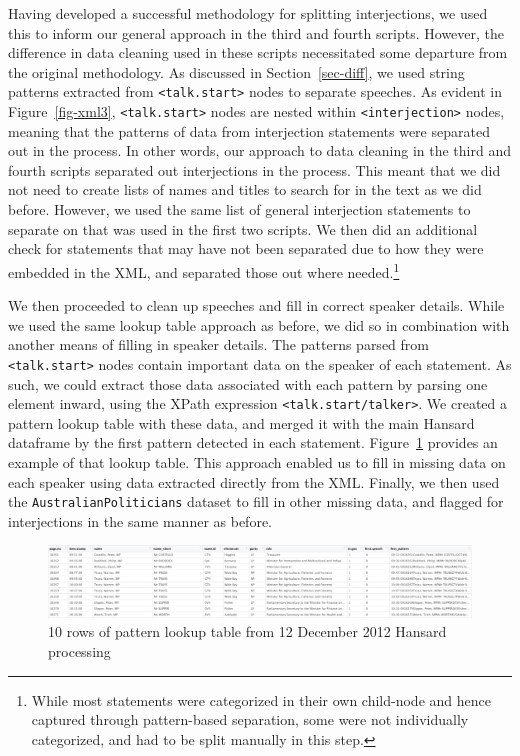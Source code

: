 \documentclass[
  letterpaper,
  DIV=11,
  numbers=noendperiod]{scrartcl}
\begin{document}
Having developed a successful methodology for splitting interjections,
we used this to inform our general approach in the third and fourth
scripts. However, the difference in data cleaning used in these scripts
necessitated some departure from the original methodology. As discussed
in Section~\ref{sec-diff}, we used string patterns extracted from
\texttt{\textless{}talk.start\textgreater{}} nodes to separate speeches.
As evident in Figure~\ref{fig-xml3},
\texttt{\textless{}talk.start\textgreater{}} nodes are nested within
\texttt{\textless{}interjection\textgreater{}} nodes, meaning that the
patterns of data from interjection statements were separated out in the
process. In other words, our approach to data cleaning in the third and
fourth scripts separated out interjections in the process. This meant
that we did not need to create lists of names and titles to search for
in the text as we did before. However, we used the same list of general
interjection statements to separate on that was used in the first two
scripts. We then did an additional check for statements that may have
not been separated due to how they were embedded in the XML, and
separated those out where needed.\footnote{While most statements were
  categorized in their own child-node and hence captured through
  pattern-based separation, some were not individually categorized, and
  had to be split manually in this step.}

We then proceeded to clean up speeches and fill in correct speaker
details. While we used the same lookup table approach as before, we did
so in combination with another means of filling in speaker details. The
patterns parsed from \texttt{\textless{}talk.start\textgreater{}} nodes
contain important data on the speaker of each statement. As such, we
could extract those data associated with each pattern by parsing one
element inward, using the XPath expression
\texttt{\textless{}talk.start/talker\textgreater{}}. We created a
pattern lookup table with these data, and merged it with the main
Hansard dataframe by the first pattern detected in each statement.
Figure~\ref{fig-patterns} provides an example of that lookup table. This
approach enabled us to fill in missing data on each speaker using data
extracted directly from the XML. Finally, we then used the
\texttt{AustralianPoliticians} dataset to fill in other missing data,
and flagged for interjections in the same manner as before.

\begin{figure}

{\centering \includegraphics{images/pattern_lookup.png}

}

\caption{\label{fig-patterns}10 rows of pattern lookup table from 12
December 2012 Hansard processing}

\end{figure}
\end{document}
